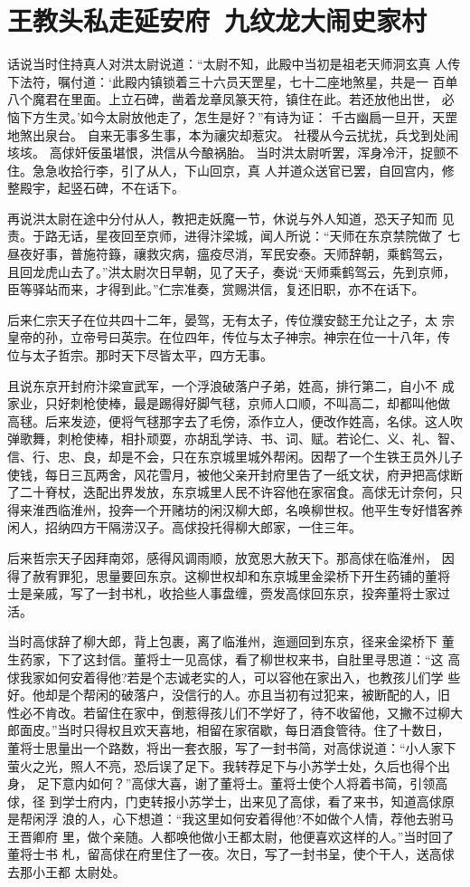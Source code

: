 \chapter{王教头私走延安府~九纹龙大闹史家村}

话说当时住持真人对洪太尉说道：“太尉不知，此殿中当初是祖老天师洞玄真
人传下法符，嘱付道：‘此殿内镇锁着三十六员天罡星，七十二座地煞星，共是一
百单八个魔君在里面。上立石碑，凿着龙章凤篆天符，镇住在此。若还放他出世，
必恼下方生灵。’如今太尉放他走了，怎生是好？”有诗为证：
千古幽扃一旦开，天罡地煞出泉台。
自来无事多生事，本为禳灾却惹灾。
社稷从今云扰扰，兵戈到处闹垓垓。
高俅奸佞虽堪恨，洪信从今酿祸胎。
当时洪太尉听罢，浑身冷汗，捉颤不住。急急收拾行李，引了从人，下山回京，真
人并道众送官已罢，自回宫内，修整殿宇，起竖石碑，不在话下。

再说洪太尉在途中分付从人，教把走妖魔一节，休说与外人知道，恐天子知而
见责。于路无话，星夜回至京师，进得汴梁城，闻人所说：“天师在东京禁院做了
七昼夜好事，普施符籙，禳救灾病，瘟疫尽消，军民安泰。天师辞朝，乘鹤驾云，
且回龙虎山去了。”洪太尉次日早朝，见了天子，奏说“天师乘鹤驾云，先到京师，
臣等驿站而来，才得到此。”仁宗准奏，赏赐洪信，复还旧职，亦不在话下。

后来仁宗天子在位共四十二年，晏驾，无有太子，传位濮安懿王允让之子，太
宗皇帝的孙，立帝号曰英宗。在位四年，传位与太子神宗。神宗在位一十八年，传
位与太子哲宗。那时天下尽皆太平，四方无事。

且说东京开封府汴梁宣武军，一个浮浪破落户子弟，姓高，排行第二，自小不
成家业，只好刺枪使棒，最是踢得好脚气毬，京师人口顺，不叫高二，却都叫他做
高毬。后来发迹，便将气毬那字去了毛傍，添作立人，便改作姓高，名俅。这人吹
弹歌舞，刺枪使棒，相扑顽耍，亦胡乱学诗、书、词、赋。若论仁、义、礼、智、
信、行、忠、良，却是不会，只在东京城里城外帮闲。因帮了一个生铁王员外儿子
使钱，每日三瓦两舍，风花雪月，被他父亲开封府里告了一纸文状，府尹把高俅断
了二十脊杖，迭配出界发放，东京城里人民不许容他在家宿食。高俅无计奈何，只
得来淮西临淮州，投奔一个开赌坊的闲汉柳大郎，名唤柳世权。他平生专好惜客养
闲人，招纳四方干隔涝汉子。高俅投托得柳大郎家，一住三年。

后来哲宗天子因拜南郊，感得风调雨顺，放宽恩大赦天下。那高俅在临淮州，
因得了赦宥罪犯，思量要回东京。这柳世权却和东京城里金梁桥下开生药铺的董将
士是亲戚，写了一封书札，收拾些人事盘缠，赍发高俅回东京，投奔董将士家过活。

当时高俅辞了柳大郎，背上包裹，离了临淮州，迤逦回到东京，径来金梁桥下
董生药家，下了这封信。董将士一见高俅，看了柳世权来书，自肚里寻思道：“这
高俅我家如何安着得他?若是个志诚老实的人，可以容他在家出入，也教孩儿们学
些好。他却是个帮闲的破落户，没信行的人。亦且当初有过犯来，被断配的人，旧
性必不肯改。若留住在家中，倒惹得孩儿们不学好了，待不收留他，又撇不过柳大
郎面皮。”当时只得权且欢天喜地，相留在家宿歇，每日酒食管待。住了十数日，
董将士思量出一个路数，将出一套衣服，写了一封书简，对高俅说道：“小人家下
萤火之光，照人不亮，恐后误了足下。我转荐足下与小苏学士处，久后也得个出身，
足下意内如何？”高俅大喜，谢了董将士。董将士使个人将着书简，引领高俅，径
到学士府内，门吏转报小苏学士，出来见了高俅，看了来书，知道高俅原是帮闲浮
浪的人，心下想道：“我这里如何安着得他?不如做个人情，荐他去驸马王晋卿府
里，做个亲随。人都唤他做小王都太尉，他便喜欢这样的人。”当时回了董将士书
札，留高俅在府里住了一夜。次日，写了一封书呈，使个干人，送高俅去那小王都
太尉处。

